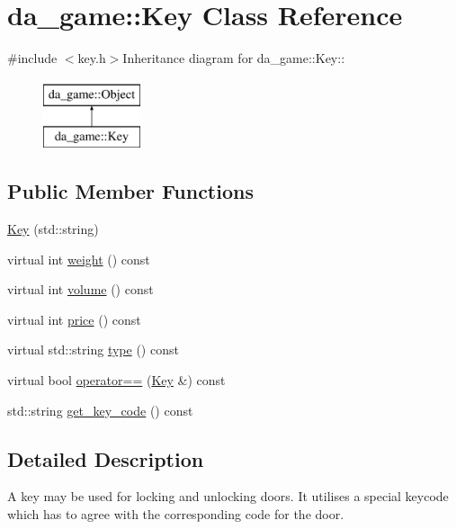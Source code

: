 \hypertarget{classda__game_1_1Key}{
\section{da\_\-game::Key Class Reference}
\label{classda__game_1_1Key}
}


{\ttfamily \#include $<$key.h$>$}Inheritance diagram for da\_\-game::Key::\begin{figure}[H]
\begin{center}
\leavevmode
\includegraphics[height=2cm]{classda__game_1_1Key}
\end{center}
\end{figure}
\subsection*{Public Member Functions}
\begin{DoxyCompactItemize}
\item 
\hyperlink{classda__game_1_1Key_a15fcc235eb6d5c76e574fd02ab9bad4b}{Key} (std::string)
\item 
virtual int \hyperlink{classda__game_1_1Key_a3a55f412166c6da8d3919978edb214e5}{weight} () const 
\item 
virtual int \hyperlink{classda__game_1_1Key_ac21b171678f19465b41796007896dc84}{volume} () const 
\item 
virtual int \hyperlink{classda__game_1_1Key_af9752b65636483258a50e7ae553d131a}{price} () const 
\item 
virtual std::string \hyperlink{classda__game_1_1Key_adaecf6030e14cd4da5142e8c760c5741}{type} () const 
\item 
virtual bool \hyperlink{classda__game_1_1Key_af3b5c0256dfcfc935e898d27dd47ffeb}{operator==} (\hyperlink{classda__game_1_1Key}{Key} \&) const 
\item 
std::string \hyperlink{classda__game_1_1Key_a1d96d265ce05db8566dfd62615de61c6}{get\_\-key\_\-code} () const 
\end{DoxyCompactItemize}


\subsection{Detailed Description}
A key may be used for locking and unlocking doors. It utilises a special keycode which has to agree with the corresponding code for the door. 

